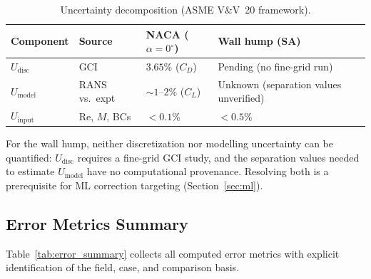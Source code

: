 \documentclass[11pt,a4paper]{article}
\begin{document}
\begin{table}[!ht]
\centering
\caption{Uncertainty decomposition (ASME V\&V~20 framework).}
\label{tab:uncertainty}
\begin{tabular}{lllll}
\toprule
\textbf{Component} & \textbf{Source} & \textbf{NACA ($\alpha{=}0^\circ$)}
  & \textbf{Wall hump (SA)} \\
\midrule
$U_\text{disc}$  & GCI              & $3.65\%$ ($C_D$) & Pending (no fine-grid run) \\
$U_\text{model}$ & RANS vs.\ expt   & ${\sim}1$--$2\%$ ($C_L$) & Unknown (separation values unverified) \\
$U_\text{input}$ & Re, $M$, BCs     & $<0.1\%$         & $<0.5\%$ \\
\bottomrule
\end{tabular}
\end{table}

\noindent For the wall hump, neither discretization nor modelling uncertainty
can be quantified: $U_\text{disc}$ requires a fine-grid GCI study, and
the separation values needed to estimate $U_\text{model}$ have no
computational provenance.  Resolving both is a prerequisite for
ML correction targeting (Section~\ref{sec:ml}).

\subsection{Error Metrics Summary}
\label{sec:error_summary}

Table~\ref{tab:error_summary} collects all computed error metrics with
explicit identification of the field, case, and comparison basis.
\end{document}
